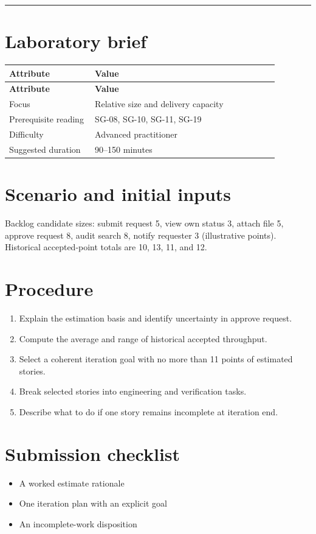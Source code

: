 \documentclass[11pt,letterpaper]{article}
\begin{document}
\tableofcontents\medskip\noindent\rule{\linewidth}{0.4pt}\medskip
\section{Laboratory brief}
\begin{longtable}{|p{0.28\linewidth}|p{0.60\linewidth}|}\hline
\textbf{Attribute} & \textbf{Value} \\ \hline\endfirsthead\hline
\textbf{Attribute} & \textbf{Value} \\ \hline\endhead
Focus & Relative size and delivery capacity \\ \hline
Prerequisite reading & SG-08, SG-10, SG-11, SG-19 \\ \hline
Difficulty & Advanced practitioner \\ \hline
Suggested duration & 90–150 minutes \\ \hline
\end{longtable}
\section{Scenario and initial inputs}
Backlog candidate sizes: submit request 5, view own status 3, attach file 5, approve request 8, audit search 8, notify requester 3 (illustrative points). Historical accepted-point totals are 10, 13, 11, and 12.

\section{Procedure}
\begin{enumerate}[leftmargin=*,itemsep=3pt]
\item Explain the estimation basis and identify uncertainty in approve request.
\item Compute the average and range of historical accepted throughput.
\item Select a coherent iteration goal with no more than 11 points of estimated stories.
\item Break selected stories into engineering and verification tasks.
\item Describe what to do if one story remains incomplete at iteration end.
\end{enumerate}
\section{Submission checklist}
\begin{itemize}[leftmargin=*,itemsep=2pt]
\item A worked estimate rationale
\item One iteration plan with an explicit goal
\item An incomplete-work disposition
\end{itemize}
\end{document}
